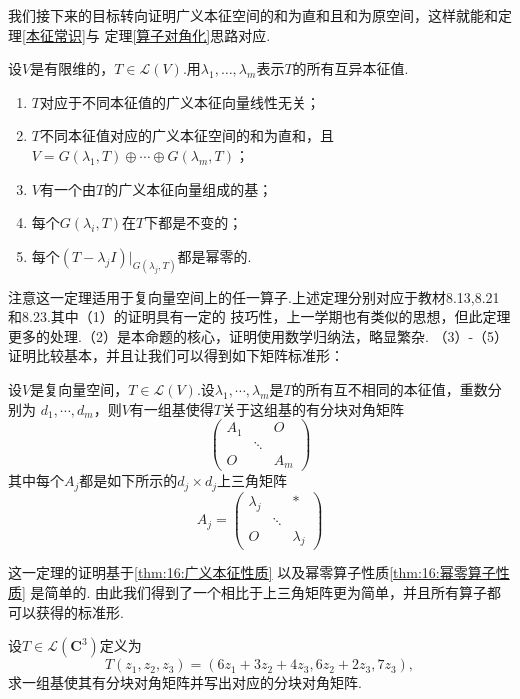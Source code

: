 我们接下来的目标转向证明广义本征空间的和为直和且和为原空间，这样就能和定理\ref{本征常识}与
定理\ref{算子对角化}思路对应.
\begin{theorem} \label{thm:16:广义本征性质}
    设$V$是有限维的，$T\in \mathcal{L}(V)$.用$\lambda_1,\ldots,\lambda_m$表示$T$的所有互异本征值.
    \begin{enumerate}
        \item $T$对应于不同本征值的广义本征向量线性无关；

        \item $T$不同本征值对应的广义本征空间的和为直和，且$V=G(\lambda_1,T)\oplus\cdots\oplus
        G(\lambda_m,T)$；

        \item $V$有一个由$T$的广义本征向量组成的基；

        \item 每个$G(\lambda_i,T)$在$T$下都是不变的；

        \item 每个$(T-\lambda_j I)\vert_{G(\lambda_j,T)}$都是幂零的.
    \end{enumerate}
\end{theorem}
注意这一定理适用于复向量空间上的任一算子.上述定理分别对应于教材8.13,8.21和8.23.其中（1）的证明具有一定的
技巧性，上一学期也有类似的思想，但此定理更多的处理.（2）是本命题的核心，证明使用数学归纳法，略显繁杂.
（3）-（5）证明比较基本，并且让我们可以得到如下矩阵标准形：
\begin{theorem}
    设$V$是复向量空间，$T\in \mathcal{L}(V)$.设$\lambda_1,\cdots,\lambda_m$是$T$的所有互不相同的本征值，重数分别为
    $d_1,\cdots,d_m$，则$V$有一组基使得$T$关于这组基的有分块对角矩阵
    \[\begin{pmatrix}
        A_1 &  & O \\  & \ddots &  \\ O &  & A_m
    \end{pmatrix}\]
    其中每个$A_j$都是如下所示的$d_j\times d_j$上三角矩阵
    \[A_j=\begin{pmatrix}
        \lambda_j &  & * \\  & \ddots &  \\ O &  & \lambda_j
    \end{pmatrix}\]
\end{theorem}
这一定理的证明基于\autoref{thm:16:广义本征性质} 以及幂零算子性质\autoref{thm:16:幂零算子性质} 是简单的.
由此我们得到了一个相比于上三角矩阵更为简单，并且所有算子都可以获得的标准形.
\begin{example}
    设$T\in \mathcal{L}(\mathbf{C}^3)$定义为
    \[T(z_1,z_2,z_3)=(6z_1+3z_2+4z_3,6z_2+2z_3,7z_3),\]求一组基使其有分块对角矩阵并写出对应的分块对角矩阵.
\end{example}
